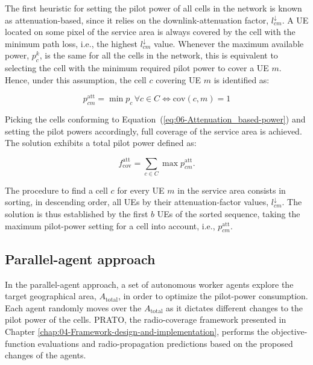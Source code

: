 The first heuristic for setting the pilot power of all cells in the
network is known as attenuation-based, since it relies on the downlink-attenuation
factor, $l_{cm}^{\downarrow}$. A UE located on some pixel of the
service area is always covered by the cell with the minimum path loss,
i.e., the highest $l{}_{cm}^{\downarrow}$ value. Whenever the maximum
available power, $p_{c}^{k}$, is the same for all the cells in the
network, this is equivalent to selecting the cell with the minimum
required pilot power to cover a UE $m$. Hence, under this assumption,
the cell $c$ covering UE $m$ is identified as:

\begin{equation}
p_{cm}^{\mathrm{att}}=\min p_{c}\,\forall c\in C\iff\mathrm{cov}(c,m)=1\label{eq:06-Attenuation_based-power}
\end{equation}


Picking the cells conforming to Equation~(\ref{eq:06-Attenuation_based-power})
and setting the pilot powers accordingly, full coverage of the service
area is achieved. The solution exhibits a total pilot power defined
as:

\begin{equation}
f_{\mathrm{cov}}^{\mathrm{att}}=\sum_{c\in C}\max p_{cm}^{\mathrm{att}}.
\end{equation}


The procedure to find a cell $c$ for every UE $m$ in the service
area consists in sorting, in descending order, all UEs by their attenuation-factor
values, $l_{cm}^{\downarrow}$. The solution is thus established by
the first $b$ UEs of the sorted sequence, taking the maximum pilot-power
setting for a cell into account, i.e., $p_{cm}^{\mathrm{att}}$.


\subsection{Parallel-agent approach \label{sub:06-Parallel_agent_approach}}

In the parallel-agent approach, a set of autonomous worker agents
explore the target geographical area, $A_{\mathrm{total}}$, in order
to optimize the pilot-power consumption. Each agent randomly moves
over the $A_{\mathrm{total}}$ as it dictates different changes to
the pilot power of the cells. PRATO, the radio-coverage framework
presented in Chapter \ref{chap:04-Framework-design-and-implementation},
performs the objective-function evaluations and radio-propagation
predictions based on the proposed changes of the agents.


